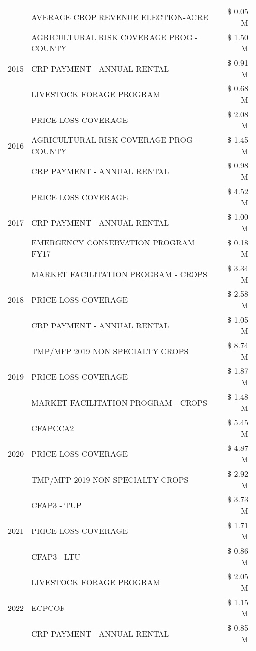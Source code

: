 \begin{tabular}{llr}
 & AVERAGE CROP REVENUE ELECTION-ACRE & \$ 0.05 M \\
\cline{1-3}
\multirow[t]{3}{*}{2015} & AGRICULTURAL RISK COVERAGE PROG - COUNTY & \$ 1.50 M \\
 & CRP PAYMENT - ANNUAL RENTAL & \$ 0.91 M \\
 & LIVESTOCK FORAGE PROGRAM & \$ 0.68 M \\
\cline{1-3}
\multirow[t]{3}{*}{2016} & PRICE LOSS COVERAGE & \$ 2.08 M \\
 & AGRICULTURAL RISK COVERAGE PROG - COUNTY & \$ 1.45 M \\
 & CRP PAYMENT - ANNUAL RENTAL & \$ 0.98 M \\
\cline{1-3}
\multirow[t]{3}{*}{2017} & PRICE LOSS COVERAGE & \$ 4.52 M \\
 & CRP PAYMENT - ANNUAL RENTAL & \$ 1.00 M \\
 & EMERGENCY CONSERVATION PROGRAM FY17 & \$ 0.18 M \\
\cline{1-3}
\multirow[t]{3}{*}{2018} & MARKET FACILITATION PROGRAM - CROPS & \$ 3.34 M \\
 & PRICE LOSS COVERAGE & \$ 2.58 M \\
 & CRP PAYMENT - ANNUAL RENTAL & \$ 1.05 M \\
\cline{1-3}
\multirow[t]{3}{*}{2019} & TMP/MFP 2019 NON SPECIALTY CROPS & \$ 8.74 M \\
 & PRICE LOSS COVERAGE & \$ 1.87 M \\
 & MARKET FACILITATION PROGRAM - CROPS & \$ 1.48 M \\
\cline{1-3}
\multirow[t]{3}{*}{2020} & CFAPCCA2 & \$ 5.45 M \\
 & PRICE LOSS COVERAGE & \$ 4.87 M \\
 & TMP/MFP 2019 NON SPECIALTY CROPS & \$ 2.92 M \\
\cline{1-3}
\multirow[t]{3}{*}{2021} & CFAP3 - TUP & \$ 3.73 M \\
 & PRICE LOSS COVERAGE & \$ 1.71 M \\
 & CFAP3 - LTU & \$ 0.86 M \\
\cline{1-3}
\multirow[t]{3}{*}{2022} & LIVESTOCK FORAGE PROGRAM & \$ 2.05 M \\
 & ECPCOF & \$ 1.15 M \\
 & CRP PAYMENT - ANNUAL RENTAL & \$ 0.85 M \\
\cline{1-3}
\bottomrule
\end{tabular}
